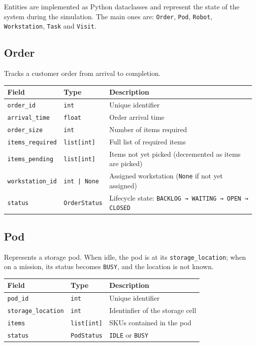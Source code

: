 \documentclass[a4paper,10pt]{article}
\begin{document}
Entities are implemented as Python dataclasses and represent the state of the system during the simulation. The main ones are: \texttt{Order}, \texttt{Pod}, \texttt{Robot}, \texttt{Workstation}, \texttt{Task} and \texttt{Visit}.

\subsection{Order}

Tracks a customer order from arrival to completion. 

\vspace{0.4em}
\begin{tabularx}{\textwidth}{l l X}
\toprule
\textbf{Field} & \textbf{Type} & \textbf{Description} \\
\midrule
\texttt{order\_id}       & \texttt{int}         & Unique identifier \\
\texttt{arrival\_time}   & \texttt{float}       & Order arrival time \\
\texttt{order\_size}     & \texttt{int}         & Number of items required \\
\texttt{items\_required} & \texttt{list[int]}   & Full list of required items \\
\texttt{items\_pending}  & \texttt{list[int]}   & Items not yet picked (decremented as items are picked)\\
\texttt{workstation\_id} & \texttt{int | None}  & Assigned workstation (\texttt{None} if not yet assigned) \\
\texttt{status}          & \texttt{OrderStatus} & Lifecycle state: \texttt{BACKLOG → WAITING → OPEN → CLOSED} \\
\bottomrule
\end{tabularx}

\subsection{Pod}

Represents a storage pod. When idle, the pod is at its \texttt{storage\_location}; when on a mission, its status becomes \texttt{BUSY}, and the location is not known.

\vspace{0.4em}
\begin{tabularx}{\textwidth}{l l X}
\toprule
\textbf{Field} & \textbf{Type} & \textbf{Description} \\
\midrule
\texttt{pod\_id}           & \texttt{int}            & Unique identifier \\
\texttt{storage\_location} & \texttt{int}            & Identinfier of the storage cell \\
\texttt{items}             & \texttt{list[int]}      & SKUs contained in the pod \\
\texttt{status}            & \texttt{PodStatus}      & \texttt{IDLE} or \texttt{BUSY} \\
\bottomrule
\end{tabularx}
\end{document}
